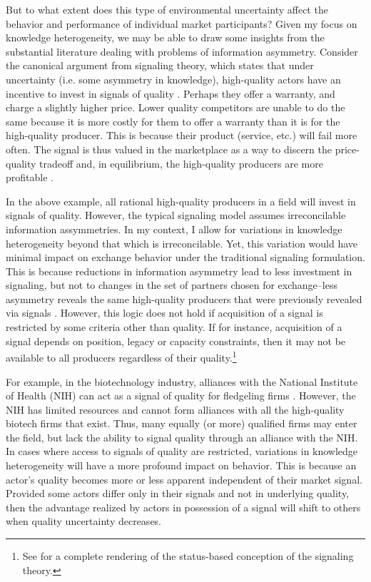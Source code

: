 But to what extent does this type of environmental uncertainty affect the behavior and performance of individual market participants? Given my focus on knowledge heterogeneity, we may be able to draw some insights from the substantial literature dealing with problems of information asymmetry. Consider the canonical argument from signaling theory, which states that under uncertainty (i.e. some asymmetry in knowledge), high-quality actors have an incentive to invest in signals of quality \citep{kirmani2001}. Perhaps they offer a warranty, and charge a slightly higher price. Lower quality competitors are unable to do the same because it is more costly for them to offer a warranty than it is for the high-quality producer. This is because their product (service, etc.) will fail more often. The signal is thus valued in the marketplace as a way to discern the price-quality tradeoff and, in equilibrium, the high-quality producers are more profitable \citep{kirmani2001, spence1973}.

In the above example, all rational high-quality producers in a field will invest in signals of quality. However, the typical signaling model assumes irreconcilable information assymmetries. In my context, I allow for variations in knowledge heterogeneity beyond that which is irreconcilable. Yet, this variation would have minimal impact on exchange behavior under the traditional signaling formulation. This is because reductions in information asymmetry lead to less investment in signaling, but not to changes in the set of partners chosen for exchange--less asymmetry reveals the same high-quality producers that were previously revealed via signals \citep{podolny2005}. However, this logic does not hold if acquisition of a signal is restricted by some criteria other than quality. If for instance, acquisition of a signal depends on position, legacy or capacity constraints, then it may not be available to all producers regardless of their quality.\footnote{See \citet{podolny2005} for a complete rendering of the status-based conception of the \citet{spence1973} signaling theory.}

For example, in the biotechnology industry, alliances with the National Institute of Health (NIH) can act as a signal of quality for fledgeling firms \citep{baum2000, podolny2001, shane2002}. However, the NIH has limited resources and cannot form alliances with all the high-quality biotech firms that exist. Thus, many equally (or more) qualified firms may enter the field, but lack the ability to signal quality through an alliance with the NIH. In cases where access to signals of quality are restricted, variations in knowledge heterogeneity will have a more profound impact on behavior. This is because an actor's quality becomes more or less apparent independent of their market signal. Provided some actors differ only in their signals and not in underlying quality, then the advantage realized by actors in possession of a signal will shift to others when quality uncertainty decreases.

